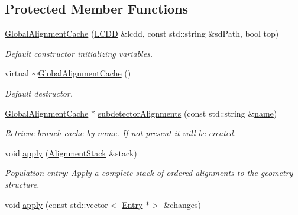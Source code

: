 \subsection*{Protected Member Functions}
\begin{DoxyCompactItemize}
\item 
\hyperlink{class_d_d4hep_1_1_alignments_1_1_global_alignment_cache_a0db78280bbba5f647f0602a0a354ed52}{Global\+Alignment\+Cache} (\hyperlink{class_d_d4hep_1_1_geometry_1_1_l_c_d_d}{L\+C\+DD} \&lcdd, const std\+::string \&sd\+Path, bool top)
\begin{DoxyCompactList}\small\item\em Default constructor initializing variables. \end{DoxyCompactList}\item 
virtual \hyperlink{class_d_d4hep_1_1_alignments_1_1_global_alignment_cache_a130666c02ddc1ffee8ae3d0da29dea49}{$\sim$\+Global\+Alignment\+Cache} ()
\begin{DoxyCompactList}\small\item\em Default destructor. \end{DoxyCompactList}\item 
\hyperlink{class_d_d4hep_1_1_alignments_1_1_global_alignment_cache}{Global\+Alignment\+Cache} $\ast$ \hyperlink{class_d_d4hep_1_1_alignments_1_1_global_alignment_cache_a0b72802fee6eaf03765e5a3cd46c5a60}{subdetector\+Alignments} (const std\+::string \&\hyperlink{class_d_d4hep_1_1_alignments_1_1_global_alignment_cache_a17cba99abb03d99b933083030ccfa91f}{name})
\begin{DoxyCompactList}\small\item\em Retrieve branch cache by name. If not present it will be created. \end{DoxyCompactList}\item 
void \hyperlink{class_d_d4hep_1_1_alignments_1_1_global_alignment_cache_a9f2812b2517bb488f3d99068fc6f4318}{apply} (\hyperlink{class_d_d4hep_1_1_alignments_1_1_alignment_stack}{Alignment\+Stack} \&stack)
\begin{DoxyCompactList}\small\item\em Population entry\+: Apply a complete stack of ordered alignments to the geometry structure. \end{DoxyCompactList}\item 
void \hyperlink{class_d_d4hep_1_1_alignments_1_1_global_alignment_cache_af4453c682c02be1f930aa0c5dbc8d5f0}{apply} (const std\+::vector$<$ \hyperlink{class_d_d4hep_1_1_alignments_1_1_global_alignment_cache_a57c878d71fabf28ccab5c04f45f48fb1}{Entry} $\ast$$>$ \&changes)
$$
\end{DoxyCompactItemize}
